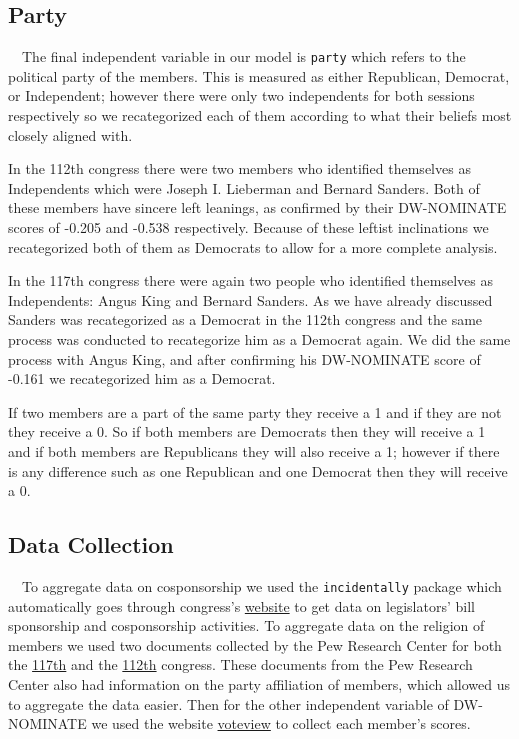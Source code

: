 \documentclass[Royal,times,sageh]{sagej}
\begin{document}
\hypertarget{party}{%
\subsection{Party}\label{party}}

\doublespacing

~~The final independent variable in our model is \texttt{party} which refers to the political party of the members. This is measured as either Republican, Democrat, or Independent; however there were only two independents for both sessions respectively so we recategorized each of them according to what their beliefs most closely aligned with.

In the 112th congress there were two members who identified themselves as Independents which were Joseph I. Lieberman and Bernard Sanders. Both of these members have sincere left leanings, as confirmed by their DW-NOMINATE scores of -0.205 and -0.538 respectively. Because of these leftist inclinations we recategorized both of them as Democrats to allow for a more complete analysis.

In the 117th congress there were again two people who identified themselves as Independents: Angus King and Bernard Sanders. As we have already discussed Sanders was recategorized as a Democrat in the 112th congress and the same process was conducted to recategorize him as a Democrat again. We did the same process with Angus King, and after confirming his DW-NOMINATE score of -0.161 we recategorized him as a Democrat.

If two members are a part of the same party they receive a 1 and if they are not they receive a 0. So if both members are Democrats then they will receive a 1 and if both members are Republicans they will also receive a 1; however if there is any difference such as one Republican and one Democrat then they will receive a 0.

\hypertarget{data-collection}{%
\subsection{Data Collection}\label{data-collection}}

\doublespacing

~~To aggregate data on cosponsorship we used the \texttt{incidentally} package which automatically goes through congress's \href{https://www.congress.gov/}{website} to get data on legislators' bill sponsorship and cosponsorship activities. To aggregate data on the religion of members we used two documents collected by the Pew Research Center for both the \href{https://www.pewresearch.org/religion/2021/01/04/faith-on-the-hill-2021/}{117th} and the \href{https://www.pewresearch.org/religion/2011/01/05/faith-on-the-hill-the-religious-composition-of-the-112th-congress/\#a-look-back}{112th} congress. These documents from the Pew Research Center also had information on the party affiliation of members, which allowed us to aggregate the data easier. Then for the other independent variable of DW-NOMINATE we used the website \href{https://voteview.com/data}{voteview} to collect each member's scores.
\end{document}
